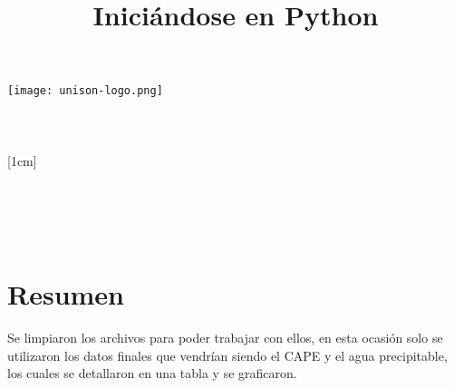 \documentclass[a4paper,12pt]{article}
\title{Iniciándose en Python}
\author{}
\newcommand{\vacio}{\textcolor{white}{holacaracola}}
\newcommand{\director}{Carlos Lizárraga Celaya}
\begin{document}
\begin{titlepage}
\begin{center}
\vspace{1cm}

\texttt{[image: unison-logo.png]}
\\[0.5cm]
{\fontsize{24}{6}\selectfont{UNIVERSIDAD DE SONORA}}\\
[1em]
{\fontsize{16}{5}\selectfont{DEPARTAMENTO DE FÍSICA}}\\
[4em]
\textcolor{azulportada}
{\fontsize{30}{5}\selectfont{\textsc{\thetitle}}}\\
[1cm]
{\fontsize{16}{5}\selectfont{Alumno:}}\\
[0.2cm]
{\fontsize{14}{5}\selectfont{Luis Alfonso Torres Flores}}\\
[1cm]
{\fontsize{16}{5}\selectfont{Profesor}}\\
[0.2cm]
{\fontsize{16}{5}\selectfont{\director}}\\
[4.5cm]
{\fontsize{14}{5}\selectfont{24 de Febrero de 2017}}\\
[4cm]
\end{center}
\restoregeometry
\end{titlepage}

\newpage
\renewcommand{\headrulewidth}{0.5pt}
\fancyhead[L]{\vacio}

\newpage
\tableofcontents
\newpage
\section{Resumen}
\noindent
Se limpiaron los archivos para poder trabajar con ellos, en esta ocasión solo se utilizaron los datos finales que vendrían siendo el CAPE y el agua precipitable, los cuales se detallaron en una tabla y se graficaron.
\end{document}
